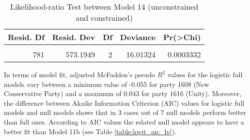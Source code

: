 \documentclass[
]{article}
\begin{document}
\begin{table}[!h]

\caption{\label{tab:unnamed-chunk-103}Likelihood-ratio Test between Model 14 (unconstrained and constrained)
                  \label{table:lrtest_5_lv}}
\centering
\begin{tabular}[t]{r|r|r|r|r}
\hline
Resid. Df & Resid. Dev & Df & Deviance & Pr(>Chi)\\
\hline
\cellcolor{gray!6}{783} & \cellcolor{gray!6}{589.2081} & \cellcolor{gray!6}{} & \cellcolor{gray!6}{} & \cellcolor{gray!6}{}\\
\hline
781 & 573.1949 & 2 & 16.01324 & 0.0003332\\
\hline
\end{tabular}
\end{table}

In terms of model fit, adjusted McFadden's pseudo \(R^2\) values for the logistic full models vary between
a minimum value of
-0.055
for party 1608
(New Conservative Party)
and a maximum of
0.043
for party 1616
(Unity).
Moreover, the difference between Akaike Information Criterion (AIC) values for logistic full models and
null models shows that in 3 cases out of 7 null models perform better than full ones. According to AIC
values the related null model appears to have a better fit than Model 11b (see Table
\ref{table:logit_aic_lv}).
\end{document}
